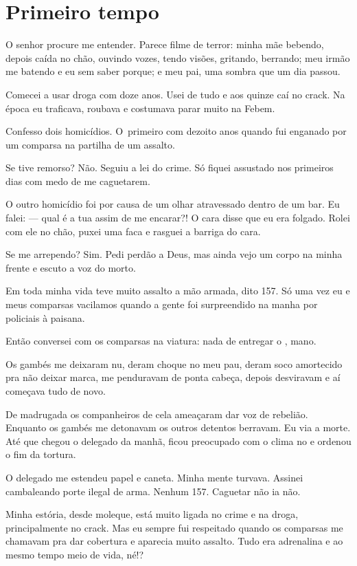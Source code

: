  

\section{Primeiro tempo}

O senhor procure me entender. Parece filme de terror: minha mãe bebendo,
depois caída no chão, ouvindo vozes, tendo visões, gritando, berrando;
meu irmão me batendo e eu sem saber porque; e meu pai, uma sombra que um
dia passou.

\asterisc{}

Comecei a usar droga com doze anos. Usei de tudo e aos quinze caí no
crack. Na época eu traficava, roubava e costumava parar muito na Febem.

Confesso dois homicídios. O~primeiro com dezoito anos quando fui
enganado por um comparsa na partilha de um assalto.

Se tive remorso? Não. Seguiu a lei do crime. Só fiquei assustado nos
primeiros dias com medo de me caguetarem.

O outro homicídio foi por causa de um olhar atravessado dentro de um
bar. Eu falei: --- qual é a tua assim de me encarar?! O cara disse que
eu era folgado. Rolei com ele no chão, puxei uma faca e rasguei a
barriga do cara.

Se me arrependo? Sim. Pedi perdão a Deus, mas ainda vejo um corpo na
minha frente e escuto a voz do morto.

Em toda minha vida teve muito assalto a mão armada, dito 157. Só uma vez
eu e meus comparsas vacilamos quando a gente foi surpreendido na manha
por policiais à paisana.

Então conversei com os comparsas na viatura: nada de entregar o ,
mano.

Os gambés me deixaram nu, deram choque no meu pau, deram soco amortecido
pra não deixar marca, me penduravam de ponta cabeça, depois desviravam e
aí começava tudo de novo.

De madrugada os companheiros de cela ameaçaram dar voz de rebelião.
Enquanto os gambés me detonavam os outros detentos berravam. Eu via a
morte. Até que chegou o delegado da manhã, ficou preocupado com o clima
no  e ordenou o fim da tortura.

O delegado me estendeu papel e caneta. Minha mente turvava. Assinei
cambaleando porte ilegal de arma. Nenhum 157. Caguetar não ia não.

Minha estória, desde moleque, está muito ligada no crime e na droga,
principalmente no crack. Mas eu sempre fui respeitado quando os
comparsas me chamavam pra dar cobertura e aparecia muito assalto. Tudo
era adrenalina e ao mesmo tempo meio de vida, né!?

